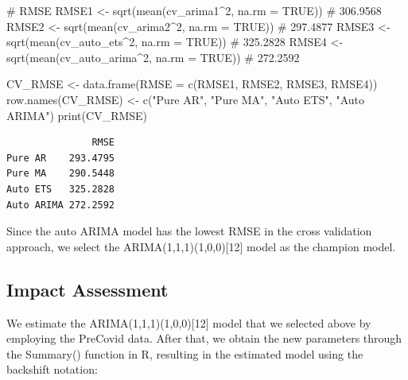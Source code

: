 \documentclass[
  letterpaper,
  DIV=11,
  numbers=noendperiod]{scrartcl}
\newenvironment{Shaded}{\begin{snugshade}}{\end{snugshade}}
\newcommand{\AttributeTok}[1]{\textcolor[rgb]{0.40,0.45,0.13}{#1}}
\newcommand{\CommentTok}[1]{\textcolor[rgb]{0.37,0.37,0.37}{#1}}
\newcommand{\ConstantTok}[1]{\textcolor[rgb]{0.56,0.35,0.01}{#1}}
\newcommand{\DecValTok}[1]{\textcolor[rgb]{0.68,0.00,0.00}{#1}}
\newcommand{\FunctionTok}[1]{\textcolor[rgb]{0.28,0.35,0.67}{#1}}
\newcommand{\NormalTok}[1]{\textcolor[rgb]{0.00,0.23,0.31}{#1}}
\newcommand{\OtherTok}[1]{\textcolor[rgb]{0.00,0.23,0.31}{#1}}
\newcommand{\SpecialCharTok}[1]{\textcolor[rgb]{0.37,0.37,0.37}{#1}}
\newcommand{\StringTok}[1]{\textcolor[rgb]{0.13,0.47,0.30}{#1}}
\begin{document}
\begin{Shaded}
\begin{Highlighting}[]
\CommentTok{\# RMSE }
\NormalTok{RMSE1 }\OtherTok{\textless{}{-}} \FunctionTok{sqrt}\NormalTok{(}\FunctionTok{mean}\NormalTok{(cv\_arima1}\SpecialCharTok{\^{}}\DecValTok{2}\NormalTok{, }\AttributeTok{na.rm =} \ConstantTok{TRUE}\NormalTok{)) }\CommentTok{\# 306.9568}
\NormalTok{RMSE2 }\OtherTok{\textless{}{-}} \FunctionTok{sqrt}\NormalTok{(}\FunctionTok{mean}\NormalTok{(cv\_arima2}\SpecialCharTok{\^{}}\DecValTok{2}\NormalTok{, }\AttributeTok{na.rm =} \ConstantTok{TRUE}\NormalTok{)) }\CommentTok{\# 297.4877}
\NormalTok{RMSE3 }\OtherTok{\textless{}{-}} \FunctionTok{sqrt}\NormalTok{(}\FunctionTok{mean}\NormalTok{(cv\_auto\_ets}\SpecialCharTok{\^{}}\DecValTok{2}\NormalTok{, }\AttributeTok{na.rm =} \ConstantTok{TRUE}\NormalTok{)) }\CommentTok{\# 325.2828}
\NormalTok{RMSE4 }\OtherTok{\textless{}{-}} \FunctionTok{sqrt}\NormalTok{(}\FunctionTok{mean}\NormalTok{(cv\_auto\_arima}\SpecialCharTok{\^{}}\DecValTok{2}\NormalTok{, }\AttributeTok{na.rm =} \ConstantTok{TRUE}\NormalTok{)) }\CommentTok{\# 272.2592}

\NormalTok{CV\_RMSE }\OtherTok{\textless{}{-}} \FunctionTok{data.frame}\NormalTok{(}\AttributeTok{RMSE =} \FunctionTok{c}\NormalTok{(RMSE1, RMSE2, RMSE3, RMSE4))}
\FunctionTok{row.names}\NormalTok{(CV\_RMSE) }\OtherTok{\textless{}{-}} \FunctionTok{c}\NormalTok{(}\StringTok{"Pure AR"}\NormalTok{, }\StringTok{"Pure MA"}\NormalTok{, }\StringTok{"Auto ETS"}\NormalTok{, }\StringTok{"Auto ARIMA"}\NormalTok{)}
\FunctionTok{print}\NormalTok{(CV\_RMSE)}
\end{Highlighting}
\end{Shaded}

\begin{verbatim}
               RMSE
Pure AR    293.4795
Pure MA    290.5448
Auto ETS   325.2828
Auto ARIMA 272.2592
\end{verbatim}

Since the auto ARIMA model has the lowest RMSE in the cross validation
approach, we select the ARIMA(1,1,1)(1,0,0){[}12{]} model as the
champion model.

\subsection{Impact Assessment}\label{impact-assessment}

We estimate the ARIMA(1,1,1)(1,0,0){[}12{]} model that we selected above
by employing the PreCovid data. After that, we obtain the new parameters
through the Summary() function in R, resulting in the estimated model
using the backshift notation:
\end{document}

